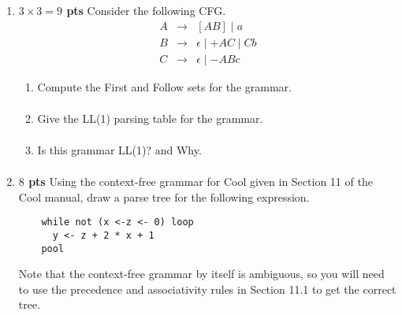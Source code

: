 \documentclass[10pt]{article}
\newcommand {\pts}[1]{{\bf #1 pts}}
\begin{document}
\begin{enumerate}
   \newpage
\item \pts{$3\times 3= 9$} Consider the following CFG.
\[\begin{array}{cll}
A & \rightarrow & [AB] \mid a \\
B & \rightarrow & \epsilon \mid +AC \mid Cb \\
C & \rightarrow & \epsilon \mid -ABc
\end{array}\]

\begin{enumerate}
  \item Compute the First and Follow sets for the grammar.
            \begin{equation*}\begin{aligned}
            \end{aligned}\end{equation*}
  \item Give the LL(1) parsing table for the grammar.
             \begin{equation*}\begin{aligned}
            \end{aligned}\end{equation*}
  \item Is this grammar LL(1)? and Why.
             \begin{equation*}\begin{aligned}
            \end{aligned}\end{equation*}
\end{enumerate}

\item \pts{$8$}  Using the context-free grammar for Cool given in Section 11 of the Cool
manual, draw a parse tree for the following expression.
  \begin{lstlisting}
    while not (x <-z <- 0) loop
      y <- z + 2 * x + 1
    pool
  \end{lstlisting}
Note that the context-free grammar by itself is ambiguous, so you will
need to use the precedence and associativity rules in Section 11.1 to
get the correct tree.
            \begin{equation*}\begin{aligned}
            \end{aligned}\end{equation*}


\end{enumerate}
\end{document}
